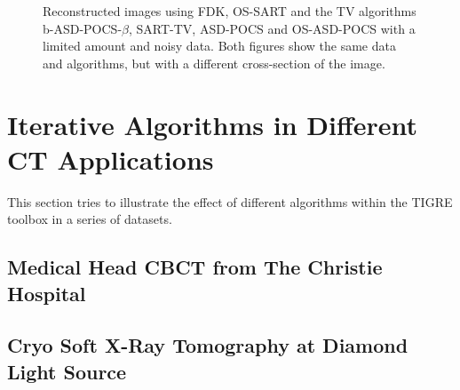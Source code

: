 \begin{figure}
\begin{tikzpicture}
\end{tikzpicture}
\caption[Reconstructed images using TV algorithms]{\label{fig:TVXCAT}Reconstructed images using FDK, OS-SART and the TV algorithms b-ASD-POCS-$\beta$, SART-TV,  ASD-POCS and OS-ASD-POCS with a limited amount and noisy data. Both figures show the same data and algorithms, but with a different cross-section of the image.}
\end{figure}


\begin{table}
\begin{center}
\caption{NRMSE for the reconstructed images in figure \ref{fig:TVXCAT}}
\label{tab:NRMSE TVs}
\end{center}
\end{table}
















\FloatBarrier
\section{Iterative Algorithms in Different CT Applications}
This section tries to illustrate the effect of different algorithms within the TIGRE toolbox in a series of datasets. 
\subsection{Medical Head CBCT from  The Christie Hospital}
\subsection{Cryo Soft X-Ray Tomography at Diamond Light Source}

